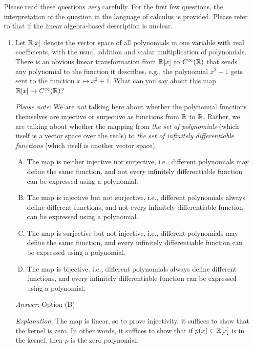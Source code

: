 \documentclass[10pt]{amsart}
\begin{document}
Please read these questions {\em very} carefully. For the first few
questions, the interpretation of the question in the language of
calculus is provided. Please refer to that if the linear algebra-based
description is unclear.

\begin{enumerate}

\item Let $\mathbb{R}[x]$ denote the vector space of all polynomials in one
  variable with real coefficients, with the usual addition and scalar
  multiplication of polynomials. There is an obvious linear
  transformation from $\mathbb{R}[x]$ to $C^\infty(\mathbb{R})$ that sends any
  polynomial to the function it describes, e.g., the polynomial $x^2 +
  1$ gets sent to the function $x \mapsto x^2 + 1$. What can you say
  about this map $\mathbb{R}[x] \to C^\infty(\mathbb{R})$?

  {\em Please note}: We are {\em not} talking here about whether the
  polynomial functions themselves are injective or surjective as
  functions from $\mathbb{R}$ to $\mathbb{R}$. Rather, we are talking about whether
  the mapping from {\em the set of polynomials} (which itself is a
  vector space over the reals) to {\em the set of infinitely
    differentiable functions} (which itself is another vector space).

  \begin{enumerate}[(A)]
  \item The map is neither injective nor surjective, i.e., different
    polynomials may define the same function, and not every infinitely
    differentiable function can be expressed using a polynomial.
  \item The map is injective but not surjective, i.e., different
    polynomials always define different functions, and not every
    infinitely differentiable function can be expressed using a
    polynomial.
  \item The map is surjective but not injective, i.e., different
    polynomials may define the same function, and every infinitely
    differentiable function can be expressed using a polynomial.
  \item The map is bijective, i.e., different polynomials always
    define different functions, and every infinitely differentiable
    function can be expressed using a polynomial.
  \end{enumerate}

  {\em Answer}: Option (B)

  {\em Explanation}: The map is linear, so to prove injectivity, it
  suffices to show that the kernel is zero. In other words, it
  suffices to show that if $p(x) \in \mathbb{R}[x]$ is in the kernel, then $p$
  is the zero polynomial.


\end{enumerate}
\end{document}
